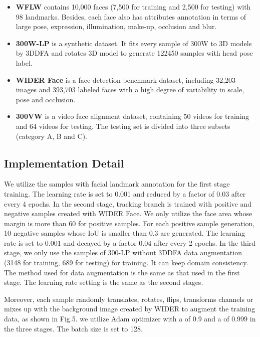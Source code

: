 \documentclass[3p,twocolumn, round, sort & compress]{elsarticle}
\begin{document}
\begin{itemize} 
	\item \textbf{WFLW} \citep{LAB} contains 10,000 faces (7,500 for training and 2,500 for testing) with 98 landmarks. Besides, each face also has attributes annotation in terms of large pose, expression, illumination, make-up, occlusion and blur.
	\item \textbf{300W-LP} \citep{3DDFA} is a synthetic dataset. It fits every sample of 300W \citep{300W} to 3D models by 3DDFA \citep{3DDFA} and rotates 3D model to generate 122450 samples with head pose label.
	\item \textbf{WIDER Face} \citep{WIDER} is a face detection benchmark dataset, including 32,203 images and 393,703 labeled faces with a high degree of variability in scale, pose and occlusion.
	\item \textbf{300VW} \citep{300VW} is a video face alignment dataset, containing 50 videos for training and 64 videos for testing. The testing set is divided into three subsets (category A, B and C).
\end{itemize}

\subsection{Implementation Detail}
We utilize the samples with facial landmark annotation for the first stage training. The learning rate is set to 0.001 and reduced by a factor of 0.03 after every 4 epochs. In the second stage, tracking branch is trained with positive and negative samples created with WIDER Face. We only utilize the face area whose margin is more than 60 for positive samples. For each positive sample generation, 10 negative samples whose IoU is smaller than 0.3 are generated. The learning rate is set to 0.001 and decayed by a factor 0.04 after every 2 epochs. In the third stage, we only use the samples of 300-LP without 3DDFA \citep{3DDFA} data augmentation (3148 for training, 689 for testing) for training. It can keep domain consistency. The method used for data augmentation is the same as that used in the first stage. The learning rate setting is the same as the second stages.

Moreover, each sample randomly translates, rotates, flips, transforms channels or mixes up with the background image created by WIDER to augment the training data, as shown in Fig.5. we utilize Adam \citep{Adam} optimizer with a  of 0.9 and a  of 0.999 in the three stages. The batch size is set to 128.
\end{document}
